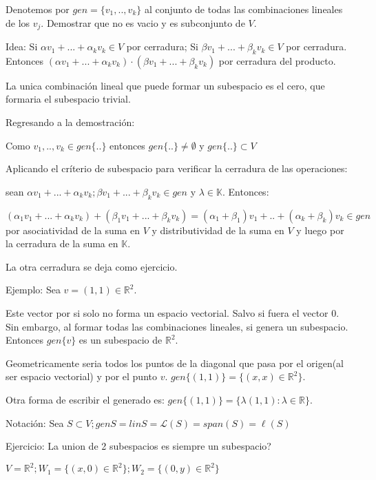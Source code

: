 \begin{poof}

    Denotemos por $gen=\{v_1,..,v_k\} $ al conjunto de todas las combinaciones lineales de los $v_j$.  Demostrar que no es vacio y es subconjunto de $V$.

   Idea: Si $\alpha v_1+...+\alpha_kv_k\in V$ por cerradura; Si $\beta v_1+...+\beta_kv_k\in V$ por cerradura. Entonces $(\alpha v_1+...+\alpha_kv_k) \cdot (\beta v_1+...+\beta_k v_k)$ por cerradura del producto.

La unica combinaci\'{o}n lineal que puede formar un subespacio es el cero, que formaria el subespacio trivial.

Regresando a la demostraci\'{o}n:

    Como $v_1,..,v_k \in gen\{..\} $ entonces $gen\{..\}\neq \emptyset $ y $gen\{..\} \subset V$

    Aplicando el cr\'{i}terio de subespacio para verificar la cerradura de las operaciones:

    sean $\alpha v_1+...+\alpha_kv_k;\beta v_1+...+\beta_kv_k \in gen$ y $\lambda\in\mathbb{K}.$ Entonces:

    $(\alpha_1 v_1+...+\alpha_kv_k) + (\beta_1 v_1+...+\beta_k v_k) = (\alpha_1 + \beta_1)v_1+..+(\alpha_k+\beta_k)v_k \in gen$ por asociatividad de la suma en $V$ y distributividad de la suma en $V$   y luego por la cerradura de la suma en $\mathbb{K}$.

    La otra cerradura se deja como ejercicio.

    Ejemplo: Sea $v=(1,1)\in\mathbb{R}^2$.

    Este vector por si solo no forma un espacio vectorial. Salvo si fuera el vector 0. Sin embargo, al formar todas las combinaciones lineales, si genera un subespacio. Entonces
    $gen\{v\}$ es un subespacio de $\mathbb{R}^2$.

    Geometricamente seria todos los puntos de la diagonal que pasa por el origen(al ser espacio vectorial) y por el punto $v$. $gen\{(1,1)\}=\{(x,x)\in\mathbb{R}^2\}$.

    Otra forma de escribir el generado es: $gen\{(1,1)\}=\{\lambda(1,1):\lambda\in\mathbb{R}\}$.

    Notaci\'{o}n: Sea $S\subset V; genS =linS = \mathcal{L}(S) = span(S) = \ell(S)$

\end{poof}

Ejercicio: La union de 2 subespacios es siempre un subespacio?

$V=\mathbb{R}^2; W_1=\{(x,0)\in\mathbb{R}^2\}; W_2 =\{(0,y)\in\mathbb{R}^2\}$

